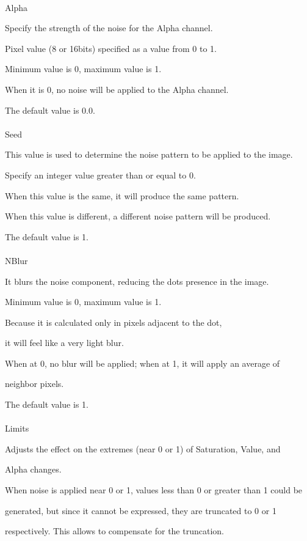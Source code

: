 \documentclass[a4paper,12pt]{article}
\begin{document}
\newpage

\thispagestyle{empty}

\ \vspace{-0.2em}
\par
\noindent Alpha\par
Specify the strength of the noise for the Alpha channel.\par
Pixel value (8 or 16bits) specified as a value from 0 to 1.\par
Minimum value is 0, maximum value is 1.\par
When it is 0, no noise will be applied to the Alpha channel.\par
The default value is 0.0.\\
\\
Seed\par
This value is used to determine the noise pattern to be applied to the image.\par
Specify an integer value greater than or equal to 0.\par
When this value is the same, it will produce the same pattern.\par
When this value is different, a different noise pattern will be produced.\par
The default value is 1.\\
\\
NBlur\par
It blurs the noise component, reducing the dots presence in the image.\par
Minimum value is 0, maximum value is 1.\par
Because it is calculated only in pixels adjacent to the dot,\par
it will feel like a very light blur.\par
When at 0, no blur will be applied; when at 1, it will apply an average of\par 
neighbor pixels.\par
The default value is 1.\\
\\
Limits\par
Adjusts the effect on the extremes (near 0 or 1) of Saturation, Value, and\par Alpha changes.\par
When noise is applied near 0 or 1, values less than 0 or greater than 1 could be\par generated, but since it cannot be expressed, they are truncated to 0 or 1\par 
respectively. This allows to compensate for the truncation.\par
\end{document}
